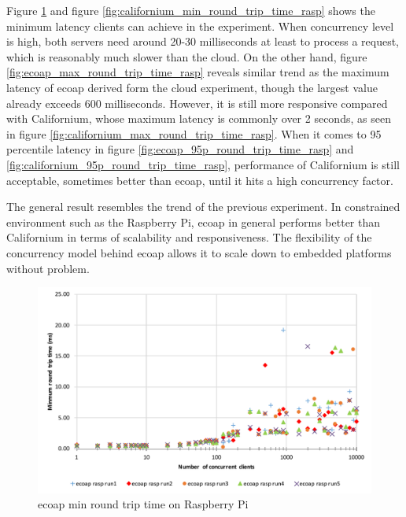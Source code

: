 Figure \ref{fig:ecoap_min_round_trip_time_rasp} and figure \ref{fig:californium_min_round_trip_time_rasp} shows the minimum latency clients can achieve in the experiment. When concurrency level is high, both servers need around 20-30 milliseconds at least to process a request, which is reasonably much slower than the cloud.
On the other hand, figure \ref{fig:ecoap_max_round_trip_time_rasp} reveals similar trend as the maximum latency of ecoap derived form the cloud experiment, though the largest value already exceeds 600 milliseconds. However, it is still more responsive compared with Californium, whose maximum latency is commonly over 2 seconds, as seen in figure \ref{fig:californium_max_round_trip_time_rasp}. When it comes to 95 percentile latency in figure \ref{fig:ecoap_95p_round_trip_time_rasp} and \ref{fig:californium_95p_round_trip_time_rasp}, performance of Californium is still acceptable, sometimes better than ecoap, until it hits a high concurrency factor.

The general result resembles the trend of the previous experiment. In constrained environment such as the Raspberry Pi, ecoap in general performs better than Californium in terms of scalability and responsiveness. The flexibility of the concurrency model behind ecoap allows it to scale down to embedded platforms without problem.


\begin{figure}[!htbp]
\centering
\includegraphics[scale = 0.8]{ecoap_min_round_trip_time_rasp}
\caption{ecoap min round trip time on Raspberry Pi}
\label{fig:ecoap_min_round_trip_time_rasp}
\end{figure}

